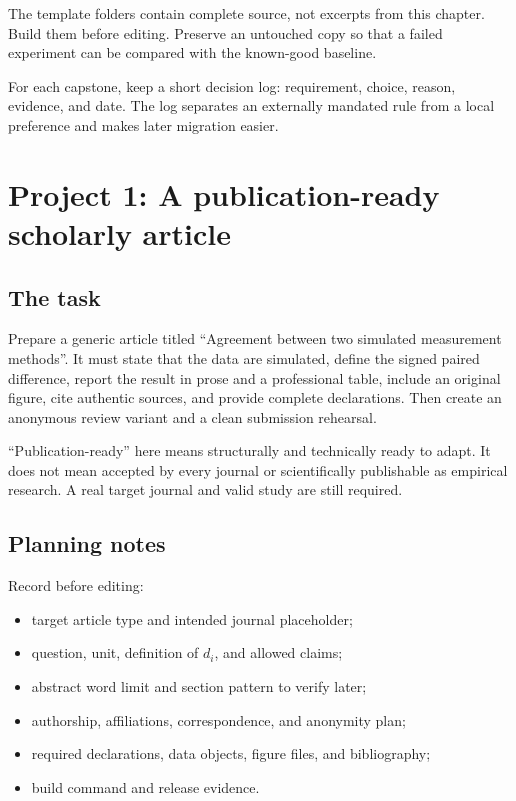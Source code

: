 The template folders contain complete source, not excerpts from this chapter.
Build them before editing. Preserve an untouched copy so that a failed
experiment can be compared with the known-good baseline.

\begin{goodpractice}
For each capstone, keep a short decision log: requirement, choice, reason,
evidence, and date. The log separates an externally mandated rule from a local
preference and makes later migration easier.
\end{goodpractice}

\section{Project 1: A publication-ready scholarly article}

\subsection{The task}

Prepare a generic article titled ``Agreement between two simulated measurement
methods''. It must state that the data are simulated, define the signed paired
difference, report the result in prose and a professional table, include an
original figure, cite authentic sources, and provide complete declarations.
Then create an anonymous review variant and a clean submission rehearsal.

``Publication-ready'' here means structurally and technically ready to adapt.
It does not mean accepted by every journal or scientifically publishable as
empirical research. A real target journal and valid study are still required.

\subsection{Planning notes}

Record before editing:

\begin{itemize}
  \item target article type and intended journal placeholder;
  \item question, unit, definition of $d_i$, and allowed claims;
  \item abstract word limit and section pattern to verify later;
  \item authorship, affiliations, correspondence, and anonymity plan;
  \item required declarations, data objects, figure files, and bibliography;
  \item build command and release evidence.
\end{itemize}

